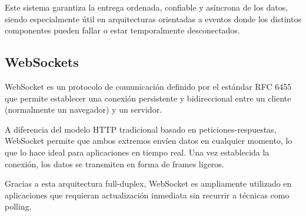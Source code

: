 Este sistema garantiza la entrega ordenada, confiable y asíncrona de los datos, siendo especialmente útil en arquitecturas orientadas a eventos donde los distintos componentes pueden fallar o estar temporalmente desconectados.

\subsection{WebSockets}

WebSocket es un protocolo de comunicación definido por el estándar RFC 6455~\citep{rfc6455_websocket} que permite establecer una conexión persistente y bidireccional entre un cliente (normalmente un navegador) y un servidor.


A diferencia del modelo HTTP tradicional basado en peticiones-respuestas, WebSocket permite que ambos extremos envíen datos en cualquier momento, lo que lo hace ideal para aplicaciones en tiempo real.
Una vez establecida la conexión, los datos se transmiten en forma de frames ligeros.

Gracias a esta arquitectura full-duplex, WebSocket es ampliamente utilizado en aplicaciones que requieran actualización inmediata sin recurrir a técnicas como polling.


